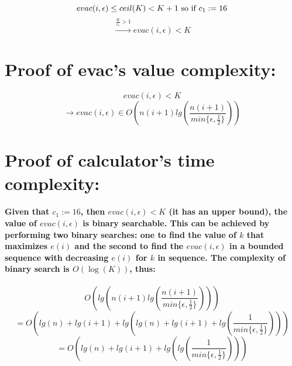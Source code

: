 \documentclass[oneside]{book}
\newcommand{\myparagraph}[1]{\paragraph{\textnormal{#1}}}
\begin{document}
$$evac(i, \epsilon) \le ceil(K) < K + 1 \textnormal{ so if } c_1 := 16 $$
$$ \xrightarrow{\frac{K}{c_1} > 1} evac(i, \epsilon) < K$$

\section{Proof of evac's value complexity:}

$$evac(i, \epsilon) < K$$
$$\rightarrow evac(i, \epsilon) \in O(n(i+1)lg(\frac{n(i+1)}{min\{\epsilon, \frac{1}{2}\}}))$$

\section{Proof of calculator's time complexity:}

\myparagraph{
Given that $c_1 := 16$, then $evac(i, \epsilon) < K$ (it has an upper bound), the value of $evac(i, \epsilon)$ is binary searchable. This can be achieved by performing two binary searches: one to find the value of $k$ that maximizes $e(i)$ and the second to find the $evac(i, \epsilon)$ in a bounded sequence with decreasing $e(i)$ for $k$ in sequence. The complexity of binary search is $O(\log(K))$, thus:
}

$$O(lg(n(i+1)lg(\frac{n(i+1)}{min\{\epsilon, \frac{1}{2}\}})))$$
$$= O(lg(n)+lg(i+1)+lg(lg(n) + lg(i+1) + lg(\frac{1}{min\{\epsilon, \frac{1}{2}\}})))$$
$$= O(lg(n)+lg(i+1)+lg(lg(\frac{1}{min\{\epsilon, \frac{1}{2}\}})))$$
\end{document}
